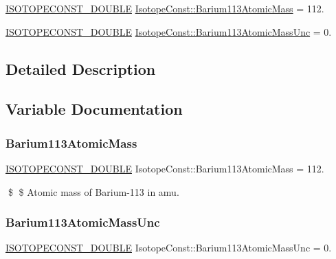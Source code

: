 \begin{DoxyCompactItemize}
\item 
\mbox{\hyperlink{group___isotope_const-_macros_ga8f45a7272ce02c0b4c65c44636ed719a}{I\+S\+O\+T\+O\+P\+E\+C\+O\+N\+S\+T\+\_\+\+D\+O\+U\+B\+LE}} \mbox{\hyperlink{group___isotope_const-_barium-_ba113_ga80492ad54d28ea1323f254fbcc37f1dd}{Isotope\+Const\+::\+Barium113\+Atomic\+Mass}} = 112.
\item 
\mbox{\hyperlink{group___isotope_const-_macros_ga8f45a7272ce02c0b4c65c44636ed719a}{I\+S\+O\+T\+O\+P\+E\+C\+O\+N\+S\+T\+\_\+\+D\+O\+U\+B\+LE}} \mbox{\hyperlink{group___isotope_const-_barium-_ba113_ga95a952a083d69ec33c6218107ceca983}{Isotope\+Const\+::\+Barium113\+Atomic\+Mass\+Unc}} = 0.
\end{DoxyCompactItemize}


\subsection{Detailed Description}


\subsection{Variable Documentation}
\mbox{\label{group___isotope_const-_barium-_ba113_ga80492ad54d28ea1323f254fbcc37f1dd}} 
\subsubsection{\texorpdfstring{Barium113\+Atomic\+Mass}{Barium113AtomicMass}}
{\footnotesize\ttfamily \mbox{\hyperlink{group___isotope_const-_macros_ga8f45a7272ce02c0b4c65c44636ed719a}{I\+S\+O\+T\+O\+P\+E\+C\+O\+N\+S\+T\+\_\+\+D\+O\+U\+B\+LE}} Isotope\+Const\+::\+Barium113\+Atomic\+Mass = 112.}

\$ \$ Atomic mass of Barium-\/113 in amu. \mbox{\label{group___isotope_const-_barium-_ba113_ga95a952a083d69ec33c6218107ceca983}} 
\subsubsection{\texorpdfstring{Barium113\+Atomic\+Mass\+Unc}{Barium113AtomicMassUnc}}
{\footnotesize\ttfamily \mbox{\hyperlink{group___isotope_const-_macros_ga8f45a7272ce02c0b4c65c44636ed719a}{I\+S\+O\+T\+O\+P\+E\+C\+O\+N\+S\+T\+\_\+\+D\+O\+U\+B\+LE}} Isotope\+Const\+::\+Barium113\+Atomic\+Mass\+Unc = 0.}


